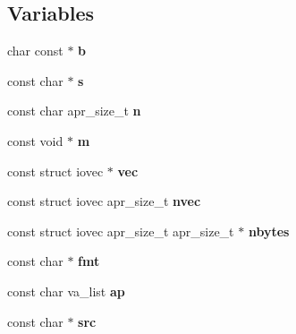 \subsection*{Variables}
\begin{DoxyCompactItemize}
\item 
\mbox{\label{group__apr__strings_gaaeb2d24214b074159a93265bf71b1841}} 
char const  $\ast$ {\bfseries b}
\item 
\mbox{\label{group__apr__strings_ga9359ed159c8b295541e3770172d34550}} 
const char $\ast$ {\bfseries s}
\item 
\mbox{\label{group__apr__strings_ga29292afc9d0df52b211c0309dd65f20e}} 
const char apr\+\_\+size\+\_\+t {\bfseries n}
\item 
\mbox{\label{group__apr__strings_gacb57d1edb8c39faf512f51b83b431cc4}} 
const void $\ast$ {\bfseries m}
\item 
\mbox{\label{group__apr__strings_gaf648625d9c46feb42d2ff877624b0e55}} 
const struct iovec $\ast$ {\bfseries vec}
\item 
\mbox{\label{group__apr__strings_gacb23e6e628f47db01b56c8cbc43a45f1}} 
const struct iovec apr\+\_\+size\+\_\+t {\bfseries nvec}
\item 
\mbox{\label{group__apr__strings_gaf0c13da0f13a4ee51a11fd8ab1a5213c}} 
const struct iovec apr\+\_\+size\+\_\+t apr\+\_\+size\+\_\+t $\ast$ {\bfseries nbytes}
\item 
\mbox{\label{group__apr__strings_ga381d684d94e6e91dee650357e8f02fa8}} 
const char $\ast$ {\bfseries fmt}
\item 
\mbox{\label{group__apr__strings_ga21ecbc810cd93b85a818c96ca2f92f1a}} 
const char va\+\_\+list {\bfseries ap}
\item 
\mbox{\label{group__apr__strings_gac566570747b87db71ea851d4d390e871}} 
const char $\ast$ {\bfseries src}
\item 
\mbox{\label{group__apr__strings_ga001fd9d21d94858ab2b3358fb9ced2c0}} 

\end{DoxyCompactItemize}

